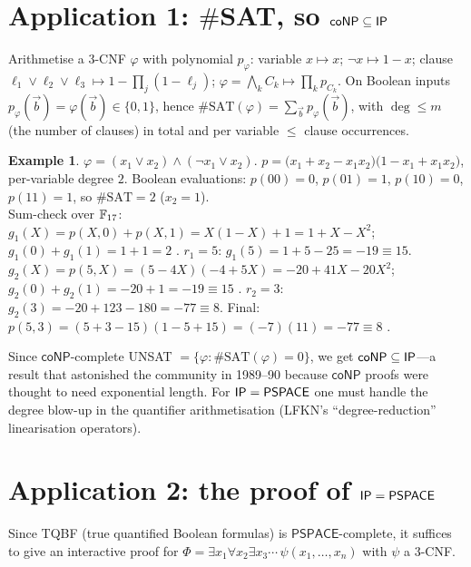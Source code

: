 \documentclass[11pt,a4paper]{report}
\theoremstyle{plain}
\theoremstyle{definition}
\newtheorem{example}[theorem]{Example}
\theoremstyle{remark}
\newcommand{\PSPACE}{\mathsf{PSPACE}}\newcommand{\AM}{\mathsf{AM}}\newcommand{\coAM}{\mathsf{coAM}}
\newcommand{\coNP}{\mathsf{coNP}}\newcommand{\PCP}{\mathsf{PCP}}
\begin{document}
\section{Application 1: \texorpdfstring{$\#$}{\#}SAT, so \texorpdfstring{$\mathsf{coNP}\subseteq\mathsf{IP}$}{coNP in IP}}\label{sec:sharpsat}
Arithmetise a 3-CNF $\varphi$ with polynomial $p_\varphi$: variable $x\mapsto x$; $\neg x\mapsto1-x$; clause $\ell_1\vee\ell_2\vee\ell_3\mapsto1-\prod_j(1-\ell_j)$; $\varphi=\bigwedge_k C_k\mapsto\prod_kp_{C_k}$. On Boolean inputs $p_\varphi(\vec b)=\varphi(\vec b)\in\{0,1\}$, hence $\#\mathrm{SAT}(\varphi)=\sum_{\vec b}p_\varphi(\vec b)$, with $\deg\le m$ (the number of clauses) in total and per variable $\le$ clause occurrences.
\begin{example}
$\varphi=(x_1\vee x_2)\wedge(\neg x_1\vee x_2)$. $p=\big(x_1+x_2-x_1x_2\big)\big(1-x_1+x_1x_2\big)$, per-variable degree $2$. Boolean evaluations: $p(00)=0$, $p(01)=1$, $p(10)=0$, $p(11)=1$, so $\#\mathrm{SAT}=2$ ($x_2=1$).\\
Sum-check over $\mathbb{F}_{17}$: $g_1(X)=p(X,0)+p(X,1)=X(1-X)+1=1+X-X^2$; $g_1(0)+g_1(1)=1+1=2$ \checkmark. $r_1=5$: $g_1(5)=1+5-25=-19\equiv15$. $g_2(X)=p(5,X)=(5-4X)(-4+5X)=-20+41X-20X^2$; $g_2(0)+g_2(1)=-20+1=-19\equiv15$ \checkmark. $r_2=3$: $g_2(3)=-20+123-180=-77\equiv8$. Final: $p(5,3)=(5+3-15)(1-5+15)=(-7)(11)=-77\equiv8$ \checkmark.
\end{example}
Since $\coNP$-complete \textsf{UNSAT} $=\{\varphi:\#\mathrm{SAT}(\varphi)=0\}$, we get $\coNP\subseteq\IP$---a result that astonished the community in 1989--90 because $\coNP$ proofs were thought to need exponential length. For $\IP=\PSPACE$ one must handle the degree blow-up in the quantifier arithmetisation (LFKN's ``degree-reduction'' linearisation operators).

\section{Application 2: the proof of \texorpdfstring{$\IP=\PSPACE$}{IP = PSPACE}}
\label{sec:ippspace}
Since \textsf{TQBF} (true quantified Boolean formulas) is $\PSPACE$-complete, it suffices to give an interactive proof for $\Phi=\exists x_1\forall x_2\exists x_3\cdots\,\psi(x_1,\dots,x_n)$ with $\psi$ a 3-CNF.
\end{document}
